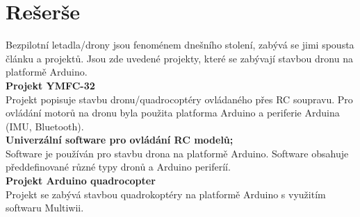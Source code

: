 \chapter{Rešerše}
\label{2-teorie}

Bezpilotní letadla/drony jsou fenoménem dnešního stolení, zabývá se jimi spousta článku a projektů. Jsou zde uvedené projekty, které se zabývají stavbou dronu na platformě Arduino.\\

\textbf{Projekt YMFC-32}\\
Projekt popisuje stavbu dronu/quadrocoptéry ovládaného přes RC soupravu. Pro ovládání motorů na dronu byla použita platforma Arduino a periferie Arduina (IMU, Bluetooth). \cite{ymfc}\\

\textbf{Univerzální software pro ovládání RC modelů;}\\
Software je používán pro stavbu drona na platformě Arduino. Software obsahuje předdefinované různé typy dronů a Arduino periferíí. \cite{multiwii}\\

\textbf{Projekt Arduino quadrocopter}\\
Projekt se zabývá stavbou quadrokoptéry na platformě Arduino s využitím softwaru  Multiwii. \cite{mydronelab}\\

